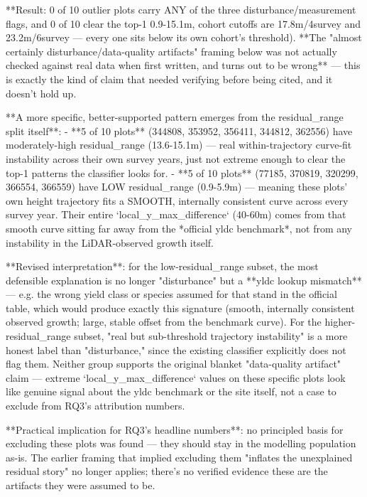 **Result: 0 of 10 outlier plots carry ANY of the three disturbance/measurement flags, and 0 of 10
clear the top-1%
0.9-15.1m, cohort cutoffs are 17.8m/4survey and 23.2m/6survey — every one sits below its own
cohort's threshold). **The "almost certainly disturbance/data-quality artifacts" framing below was
not actually checked against real data when first written, and turns out to be wrong** — this is
exactly the kind of claim that needed verifying before being cited, and it doesn't hold up.

**A more specific, better-supported pattern emerges from the residual_range split itself**:
- **5 of 10 plots** (344808, 353952, 356411, 344812, 362556) have moderately-high residual_range
  (13.6-15.1m) — real within-trajectory curve-fit instability across their own survey years, just
  not extreme enough to clear the top-1%
  patterns the classifier looks for.
- **5 of 10 plots** (77185, 370819, 320299, 366554, 366559) have LOW residual_range (0.9-5.9m) —
  meaning these plots' own height trajectory fits a SMOOTH, internally consistent curve across
  every survey year. Their entire `local_y_max_difference` (40-60m) comes from that smooth curve
  sitting far away from the *official yldc benchmark*, not from any instability in the
  LiDAR-observed growth itself.

**Revised interpretation**: for the low-residual_range subset, the most defensible explanation is
no longer "disturbance" but a **yldc lookup mismatch** — e.g. the wrong yield class or species
assumed for that stand in the official table, which would produce exactly this signature (smooth,
internally consistent observed growth; large, stable offset from the benchmark curve). For the
higher-residual_range subset, "real but sub-threshold trajectory instability" is a more honest
label than "disturbance," since the existing classifier explicitly does not flag them. Neither
group supports the original blanket "data-quality artifact" claim — extreme `local_y_max_difference`
values on these specific plots look like genuine signal about the yldc benchmark or the site
itself, not a case to exclude from RQ3's attribution numbers.

**Practical implication for RQ3's headline numbers**: no principled basis for excluding these
plots was found — they should stay in the modelling population as-is. The earlier framing that
implied excluding them "inflates the unexplained residual story" no longer applies; there's no
verified evidence these are the artifacts they were assumed to be.

